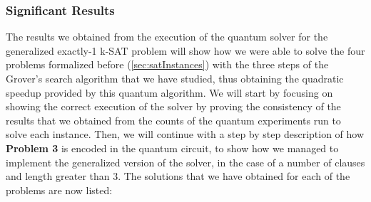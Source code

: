 \documentclass[english]{article}
\begin{document}
			\subsubsection{Significant Results}
			\label{sec:quantumResults}
				The results we obtained from the execution of the quantum solver for the generalized exactly-1 k-SAT problem will show how we were able to solve the four problems formalized before (\ref{sec:satInstances}) with the three steps of the Grover's search algorithm that we have studied, thus obtaining the quadratic speedup provided by this quantum algorithm. We will start by focusing on showing the correct execution of the solver by proving the consistency of the results that we obtained from the counts of the quantum experiments run to solve each instance. Then, we will continue with a step by step description of how \textbf{Problem 3} is encoded in the quantum circuit, to show how we managed to implement the generalized version of the solver, in the case of a number of clauses and length greater than 3. The solutions that we have obtained for each of the problems are now listed:
\end{document}
